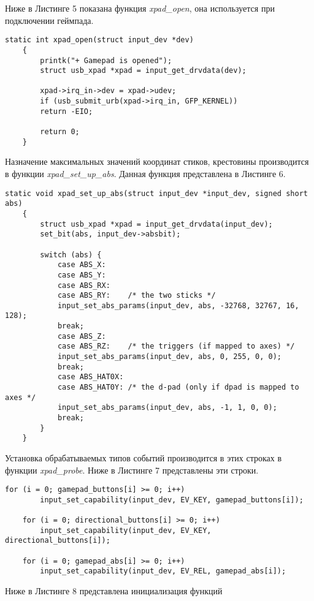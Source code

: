 Ниже в Листинге 5 показана функция \textit{xpad\_open}, она используется при подключении геймпада.
 \begin{lstlisting}[caption=Функция xpad\_open]
 	static int xpad_open(struct input_dev *dev)
 	{
 		printk("+ Gamepad is opened");
 		struct usb_xpad *xpad = input_get_drvdata(dev);
 		
 		xpad->irq_in->dev = xpad->udev;
 		if (usb_submit_urb(xpad->irq_in, GFP_KERNEL))
 		return -EIO;
 		
 		return 0;
 	}
 \end{lstlisting}

Назначение максимальных значений координат стиков, крестовины производится в функции \textit{xpad\_set\_up\_abs}. 
Данная функция представлена в Листинге 6.
\begin{lstlisting}[caption=Функция xpad\_set\_up\_abs]
	static void xpad_set_up_abs(struct input_dev *input_dev, signed short abs)
	{
		struct usb_xpad *xpad = input_get_drvdata(input_dev);
		set_bit(abs, input_dev->absbit);
		
		switch (abs) {
			case ABS_X:
			case ABS_Y:
			case ABS_RX:
			case ABS_RY:	/* the two sticks */
			input_set_abs_params(input_dev, abs, -32768, 32767, 16, 128);
			break;
			case ABS_Z:
			case ABS_RZ:	/* the triggers (if mapped to axes) */
			input_set_abs_params(input_dev, abs, 0, 255, 0, 0);
			break;
			case ABS_HAT0X:
			case ABS_HAT0Y:	/* the d-pad (only if dpad is mapped to axes */
			input_set_abs_params(input_dev, abs, -1, 1, 0, 0);
			break;
		}
	}
\end{lstlisting}

Установка обрабатываемых типов событий производится в этих строках в функции \textit{xpad\_probe}.
Ниже в Листинге 7 представлены эти строки.
 \begin{lstlisting}[caption=Установка обрабатываемых типов событий]
	for (i = 0; gamepad_buttons[i] >= 0; i++)
		input_set_capability(input_dev, EV_KEY, gamepad_buttons[i]);
	
	for (i = 0; directional_buttons[i] >= 0; i++)
		input_set_capability(input_dev, EV_KEY, directional_buttons[i]);
	
	for (i = 0; gamepad_abs[i] >= 0; i++)
		input_set_capability(input_dev, EV_REL, gamepad_abs[i]);
\end{lstlisting}

Ниже в Листинге 8 представлена инициализация функций

